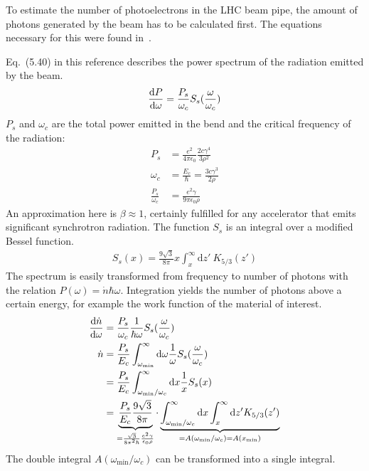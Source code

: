 
To estimate the number of photoelectrons in the LHC beam pipe, the amount of photons generated by the beam has to be calculated first.
The equations necessary for this were found in~\cite{hofmann}.

Eq.~(5.40) in this reference describes the power spectrum of the radiation emitted by the beam.
\begin{align}
    \frac{\text{d}P}{\text{d}\omega} = \frac{P_s}{\omega_c} S_s(\frac{\omega}{\omega_c})
    \label{eq:dp}
\end{align}
$P_s$ and $\omega_c$ are the total power emitted in the bend and the critical frequency of the radiation:
\begin{align}
    P_s &= \frac{e^2}{4\pi\epsilon_0}\frac{2c\gamma^4}{3\rho^2}
    \label{eq:ps}
    \\
    \omega_c &= \frac{E_c}{\hbar} = \frac{3c\gamma^3}{2\rho}
    \label{eq:omega_c}
    \\
    \frac{P_s}{\omega_c} &= \frac{e^2\gamma}{9\pi\epsilon_0\rho}
\end{align}
An approximation here is $\beta\approx1$, certainly fulfilled for any accelerator that emits significant synchrotron radiation.
The function $S_s$ is an integral over a modified Bessel function.
\begin{align}
    S_s(x) = \frac{9\sqrt{3}}{8\pi} x \int_x^\infty \text{d}z'\ K_{5/3}(z')
    \label{eq:s_s}
\end{align}
The spectrum is easily transformed from frequency to number of photons with the relation $P(\omega)=\dot{n}\hbar\omega$.
Integration yields the number of photons above a certain energy, for example the work function of the material of interest.
\begin{align}
    \frac{\text{d}\dot{n}}{\text{d}\omega} &= \frac{P_s}{\omega_c} \frac{1}{\hbar\omega}S_s(\frac{\omega}{\omega_c})
    \label{eq:nomega}
    \\
    \dot{n} &= \frac{P_s}{E_c}\int_{\omega_\text{min}}^\infty \text{d}\omega \frac{1}{\omega} S_s(\frac{\omega}{\omega_c})
    \\
    &= \frac{P_s}{E_c}\int_{\omega_\text{min}/\omega_c}^\infty \text{d}x \frac{1}{x} S_s(x)
    \\
    &= \underbrace{\frac{P_s}{E_c}  \frac{9\sqrt{3}}{8\pi}}_{=\frac{\sqrt{3}}{8\pi^2\hbar}\frac{e^2\gamma}{\epsilon_0\rho}}
    \cdot
    \underbrace{\int_{\omega_\text{min}/\omega_c}^\infty \text{d}x  \int_x^\infty \text{d}z' K_{5/3}(z')}_{=A(\omega_\text{min}/\omega_c) = A(x_\text{min})}
\end{align}
The double integral $A(\omega_\text{min}/\omega_c)$ can be transformed into a single integral.
